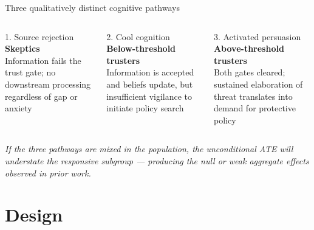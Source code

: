 \documentclass[aspectratio=169,11pt]{beamer}
\begin{document}
\begin{frame}{Three qualitatively distinct cognitive pathways}

\begin{columns}[T]
\begin{block}{\textcolor{sbured}{1. Source rejection}}
\centering \textbf{Skeptics} \\[4pt]
{\small Information fails the trust gate; no downstream processing regardless of gap or anxiety}
\end{block}

\begin{block}{\textcolor{sbuamber}{2. Cool cognition}}
\centering \textbf{Below-threshold trusters} \\[4pt]
{\small Information is accepted and beliefs update, but insufficient vigilance to initiate policy search}
\end{block}

\begin{block}{\textcolor{sbugreen}{3. Activated persuasion}}
\centering \textbf{Above-threshold trusters} \\[4pt]
{\small Both gates cleared; sustained elaboration of threat translates into demand for protective policy}
\end{block}
\end{columns}

\vspace{0.4cm}
\begin{center}
{\small \textit{If the three pathways are mixed in the population, the unconditional ATE will understate the responsive subgroup --- producing the null or weak aggregate effects observed in prior work.}}
\end{center}

\end{frame}

\section{Design}
\end{document}
